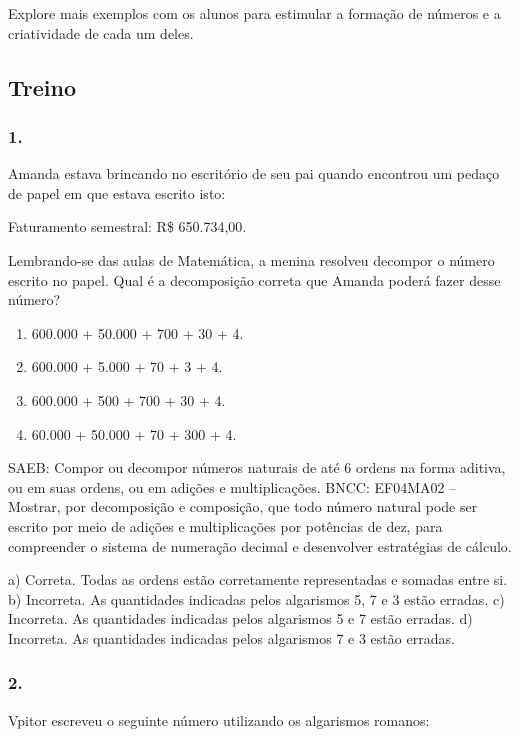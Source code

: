 \begin{enumerate}
Explore mais exemplos com os alunos para estimular a formação de números
e a criatividade de cada um deles.

\subsection{Treino}\label{treino}

\subsubsection{1.}\label{section-10}

Amanda estava brincando no escritório de seu pai quando encontrou um
pedaço de papel em que estava escrito isto:

Faturamento semestral: R\$ 650.734,00.

Lembrando-se das aulas de Matemática, a menina resolveu decompor o número escrito
no papel. Qual é a decomposição correta que Amanda poderá fazer desse
número?

\begin{enumerate}
\def\labelenumi{\alph{enumi})}
\item
  600.000 + 50.000 + 700 + 30 + 4.
\item
  600.000 + 5.000 + 70 + 3 + 4.
\item
  600.000 + 500 + 700 + 30 + 4.
\item
  60.000 + 50.000 + 70 + 300 + 4.
\end{enumerate}

SAEB: Compor ou decompor números naturais de até 6 ordens na forma aditiva, ou em suas ordens, ou em adições e multiplicações.
BNCC: EF04MA02 -- Mostrar, por decomposição e composição, que todo número natural pode ser escrito
por meio de adições e multiplicações por potências de dez, para compreender o sistema de
numeração decimal e desenvolver estratégias de cálculo.

a) Correta. Todas as ordens estão corretamente representadas e somadas entre si.
b) Incorreta. As quantidades indicadas pelos algarismos 5, 7 e 3 estão erradas.
c) Incorreta. As quantidades indicadas pelos algarismos 5 e 7 estão erradas.
d) Incorreta. As quantidades indicadas pelos algarismos 7 e 3 estão erradas.


\subsubsection{2.}\label{section-11}

Vpitor escreveu o seguinte número utilizando os algarismos romanos:


\end{enumerate}
